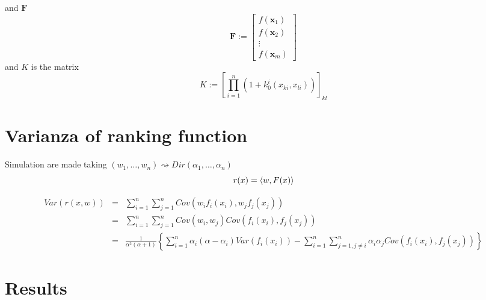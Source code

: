 and $\mathbf{F}$
\begin{equation*}
 \mathbf{F} := \left[
 \begin{array}{ccc}
  f( \mathbf{x}_1 ) \\
  f( \mathbf{x}_2 ) \\
  \vdots \\
  f( \mathbf{x}_m )
 \end{array}
 \right]
\end{equation*}
and $K$ is the matrix
\begin{equation*}
 K := \left[ \prod\limits_{i=1}^n ( 1 + k_0^i( x_{ki}, x_{li} ) ) \right]_{kl}
\end{equation*}


\section{Varianza of ranking function}
Simulation are made taking $(w_1,\ldots,w_n) \rightsquigarrow Dir( \alpha_1, \ldots, \alpha_n )$
\begin{equation*}
 r(x) = \left\langle w,F(x)\right\rangle
\end{equation*}

\begin{eqnarray*}
 Var(r(x,w)) & = & \sum\limits_{i=1}^n\sum\limits_{j=1}^n Cov( w_i f_i(x_i), w_j f_j(x_j) ) \\
 & = &  \sum\limits_{i=1}^n\sum\limits_{j=1}^n Cov( w_i, w_j ) Cov( f_i(x_i), f_j(x_j) ) \\
 & = &  \frac{1}{\alpha^2(\alpha + 1 )} \left\{ \sum\limits_{i=1}^n \alpha_i( \alpha - \alpha_i)
Var(f_i(x_i)) - \sum\limits_{i=1}^n\sum\limits_{j=1,j\neq i}^n \alpha_i\alpha_j Cov( f_i(x_i),
f_j(x_j) ) \right\}
\end{eqnarray*}

\begin{algorithm}
 
\end{algorithm}



\section{Results}

